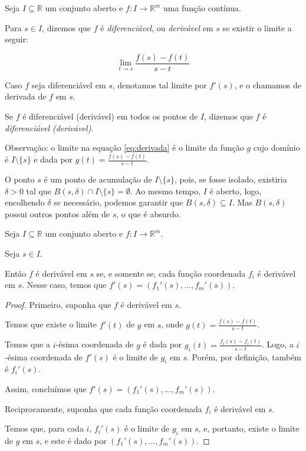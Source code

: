 \begin{definition}
    Seja $I\subseteq \mathbb R$ um conjunto aberto e $f: I\rightarrow \mathbb R^m$ uma função contínua.

    Para $s \in I$, dizemos que $f$ é \emph{diferenciável}, ou \emph{derivável} em $s$ se existir o limite a seguir:

    \begin{equation}\label{eq:derivada}
        \lim_{t \to s} \frac{f(s)-f(t)}{s-t}
    \end{equation}

    Caso $f$ seja diferenciável em $s$, denotamos tal limite por $f'(s)$, e o chamamos de derivada de $f$ em $s$.

    Se $f$ é diferenciável (derivável) em todos os pontos de $I$, dizemos que $f$ é \emph{diferenciável (derivável)}.
\end{definition}

Observação: o limite na equação \eqref{eq:derivada} é o limite da função $g$ cujo domínio é $I\setminus \{s\}$ e dada por $g(t) = \frac{f(s)-f(t)}{s-t}$.

O ponto $s$ é um ponto de acumulação de $I\setminus\{s\}$, pois, se fosse isolado, existiria $\delta>0$ tal que $B(s, \delta)\cap I\setminus\{s\}=\emptyset$.
Ao mesmo tempo, $I$ é aberto, logo, encolhendo $\delta$ se necessário, podemos garantir que $B(s, \delta)\subseteq I$.
Mas $B(s, \delta)$ possui outros pontos além de $s$, o que é absurdo.

\begin{proposition}
    Seja $I\subseteq \mathbb R$ um conjunto aberto e $f: I\rightarrow \mathbb R^m$.

    Seja $s \in I$.
    
    Então $f$ é derivável em $s$ se, e somente se, cada função coordenada $f_i$ é derivável em $s$.
    Nesse caso, temos que $f'(s) = (f_1'(s), \dots, f_m'(s))$.
\end{proposition}
\begin{proof}
    Primeiro, suponha que $f$ é derivável em $s$.

    Temos que existe o limite $f'(t)$ de $g$ em $s$, onde $g(t) = \frac{f(s)-f(t)}{s-t}$.

    Temos que a $i$-ésima coordenada de $g$ é dada por $g_i(t) = \frac{f_i(s)-f_i(t)}{s-t}$.
    Logo, a $i$-ésima coordenada de $f'(s)$ é o limite de $g_i$ em $s$. Porém, por definição, também é $f_i'(s)$.

    Assim, concluímos que $f'(s) = (f_1'(s), \dots, f_m'(s))$.

    Reciprocamente, suponha que cada função coordenada $f_i$ é derivável em $s$.

    Temos que, para cada $i$, $f_i'(s)$ é o limite de $g_i$ em $s$, e, portanto, existe o limite de $g$ em $s$, e este é dado por $(f_1'(s), \dots, f_m'(s))$.
\end{proof}
